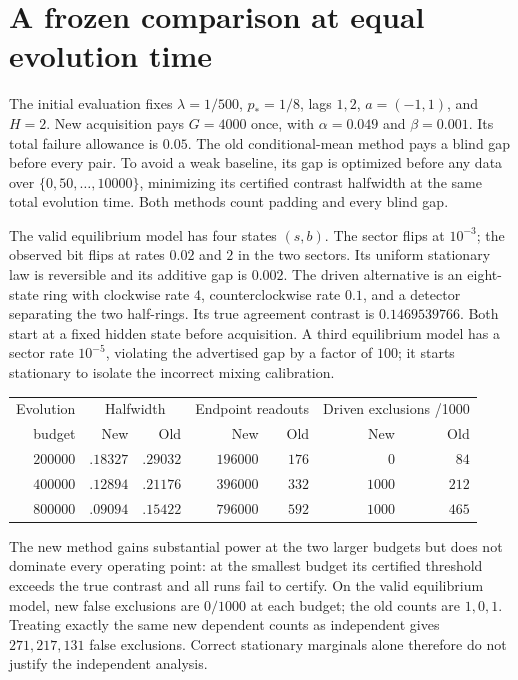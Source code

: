 \section{A frozen comparison at equal evolution time}
The initial evaluation fixes $\lambda=1/500$, $p_*=1/8$, lags $1,2$,
$a=(-1,1)$, and $H=2$. New acquisition pays $G=4000$ once, with
$\alpha=0.049$ and $\beta=0.001$. Its total failure allowance is $0.05$.
The old conditional-mean method pays a blind gap before every pair. To avoid
a weak baseline, its gap is optimized before any data over
$\{0,50,\ldots,10000\}$, minimizing its certified contrast halfwidth at the
same total evolution time. Both methods count padding and every blind gap.

The valid equilibrium model has four states $(s,b)$. The sector flips at
$10^{-3}$; the observed bit flips at rates $0.02$ and $2$ in the two sectors.
Its uniform stationary law is reversible and its additive gap is $0.002$.
The driven alternative is an eight-state ring with clockwise rate $4$,
counterclockwise rate $0.1$, and a detector separating the two half-rings.
Its true agreement contrast is $0.1469539766$. Both start at a fixed hidden
state before acquisition. A third equilibrium model has a sector rate
$10^{-5}$, violating the advertised gap by a factor of $100$; it starts
stationary to isolate the incorrect mixing calibration.

\begin{center}
\begin{tabular}{r|rr|rr|rr}
Evolution & \multicolumn{2}{c|}{Halfwidth} &
\multicolumn{2}{c|}{Endpoint readouts} &
\multicolumn{2}{c}{Driven exclusions /1000}\\
budget & New & Old & New & Old & New & Old\\\hline
$200000$ & $.18327$ & $.29032$ & $196000$ & $176$ & $0$ & $84$\\
$400000$ & $.12894$ & $.21176$ & $396000$ & $332$ & $1000$ & $212$\\
$800000$ & $.09094$ & $.15422$ & $796000$ & $592$ & $1000$ & $465$
\end{tabular}
\end{center}

The new method gains substantial power at the two larger budgets but does
not dominate every operating point: at the smallest budget its certified
threshold exceeds the true contrast and all runs fail to certify. On the
valid equilibrium model, new false exclusions are $0/1000$ at each budget;
the old counts are $1,0,1$. Treating exactly the same new dependent counts
as independent gives $271,217,131$ false exclusions. Correct stationary
marginals alone therefore do not justify the independent analysis.

